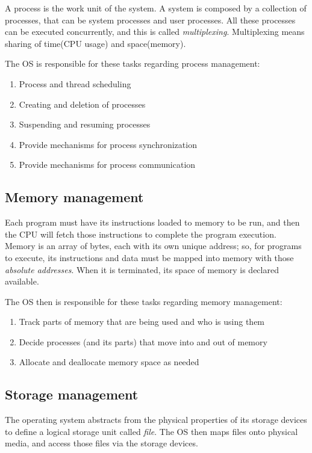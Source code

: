\documentclass{article}
\begin{document}
A process is the work unit of the system. A system is composed by
a collection of processes, that can be system processes and user processes. All these processes can be executed concurrently, and this is called \emph{multiplexing}. Multiplexing means sharing of time(CPU usage) and space(memory).

The OS is responsible for these tasks regarding process management:
\begin{enumerate}
  \item Process and thread scheduling
  \item Creating and deletion of processes
  \item Suspending and resuming processes
  \item Provide mechanisms for process synchronization
  \item Provide mechanisms for process communication
\end{enumerate}

\subsection{Memory management}
Each program must have its instructions loaded to memory to be run, and then the CPU will fetch those instructions to complete the program execution. Memory is an array of bytes, each with its own unique address; so, for programs to execute, its instructions and data must be mapped into memory with those \emph{absolute addresses}. When it is terminated, its space of memory is declared available.

The OS then is responsible for these tasks regarding memory management:
\begin{enumerate}
  \item Track parts of memory that are being used and who is using them
  \item Decide processes (and its parts) that move into and out of memory
  \item Allocate and deallocate memory space as needed
\end{enumerate}


\subsection{Storage management}
The operating system abstracts from the physical properties of its storage devices to define a logical storage unit called \emph{file}. The OS then maps files onto physical media, and access those files via the storage devices.
\end{document}
